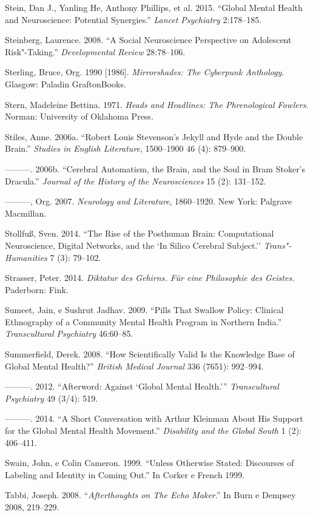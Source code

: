 Stein, Dan J., Yanling He, Anthony Phillips, et al. 2015. ``Global
Mental Health and Neuroscience: Potential Synergies.'' \emph{Lancet
Psychiatry} 2:178--185.

Steinberg, Laurence. 2008. ``A Social Neuroscience Perspective on
Adolescent Risk"-Taking.'' \emph{Developmental Review} 28:78--106.

Sterling, Bruce, Org. 1990 {[}1986{]}. \emph{Mirrorshades: The Cyberpunk
Anthology.} Glasgow: Paladin GraftonBooks.

Stern, Madeleine Bettina. 1971. \emph{Heads and Headlines: The
Phrenological Fowlers.} Norman: University of Oklahoma Press.

Stiles, Anne. 2006a. ``Robert Louis Stevenson's Jekyll and Hyde and the
Double Brain.'' \emph{Studies in English Literature}, 1500--1900 46 (4):
879--900.

---------. 2006b. ``Cerebral Automatism, the Brain, and the Soul in Bram
Stoker's Dracula.'' \emph{Journal of the History of the Neurosciences}
15 (2): 131--152.

---------, Org. 2007. \emph{Neurology and Literature}, 1860--1920. New
York: Palgrave Macmillan.

Stollfuß, Sven. 2014. ``The Rise of the Posthuman Brain: Computational
Neuroscience, Digital Networks, and the `In Silico Cerebral Subject.''
\emph{Trans"-Humanities} 7 (3): 79--102.

Strasser, Peter. 2014. \emph{Diktatur des Gehirns. Für eine Philosophie
des Geistes.} Paderborn: Fink.

Sumeet, Jain, e Sushrut Jadhav. 2009. ``Pills That Swallow Policy:
Clinical Ethnography of a Community Mental Health Program in Northern
India.'' \emph{Transcultural Psychiatry} 46:60--85.

Summerfield, Derek. 2008. ``How Scientifically Valid Is the Knowledge
Base of Global Mental Health?'' \emph{British Medical Journal} 336
(7651): 992--994.

---------. 2012. ``Afterword: Against `Global Mental Health.'''
\emph{Transcultural Psychiatry} 49 (3/4): 519.

---------. 2014. ``A Short Conversation with Arthur Kleinman About His
Support for the Global Mental Health Movement.'' \emph{Disability and
the Global South} 1 (2): 406--411.

Swain, John, e Colin Cameron. 1999. ``Unless Otherwise Stated:
Discourses of Labeling and Identity in Coming Out.'' In Corker e French
1999.

Tabbi, Joseph. 2008. ``\emph{Afterthoughts on The Echo Maker}.'' In Burn
e Dempsey 2008, 219--229.

